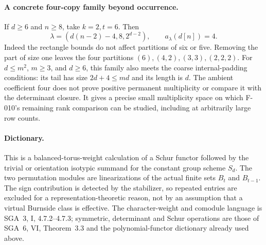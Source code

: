 \paragraph{A concrete four-copy family beyond occurrence.}
If \(d\geq6\) and \(n\geq8\), take \(k=2,t=6\). Then
\[
 \lambda=(d(n-2)-4,8,2^{d-2}),\qquad
                         a_\lambda(d[n])=4.
\]
Indeed the rectangle bounds do not affect partitions of six or
five. Removing the part of size one leaves the four partitions
\((6),(4,2),(3,3),(2,2,2)\).
For \(d\leq m^2\), \(m\geq3\), and \(d\geq6\), this family
also meets the coarse internal-padding conditions:
its tail has size \(2d+4\leq md\) and its length is \(d\).
The ambient coefficient four does not prove positive permanent
multiplicity or compare it with the determinant closure.
It gives a precise small multiplicity space on which F-010's
remaining rank comparison can be studied, including at arbitrarily
large row counts.

\paragraph{Dictionary.}
This is a balanced-torus-weight calculation of a Schur functor
followed by the trivial or orientation isotypic summand for
the constant group scheme \(S_d\). The two permutation modules
are linearizations of the actual finite sets \(B_t\) and
\(B_{t-1}\). The sign contribution is detected by the stabilizer,
so repeated entries are excluded for a representation-theoretic
reason, not by an assumption that a virtual Burnside class is
effective. The character-weight and comodule language is SGA~3,
I, 4.7.2--4.7.3; symmetric, determinant and Schur operations
are those of SGA~6, VI, Theorem~3.3 and the polynomial-functor
dictionary already used above.

